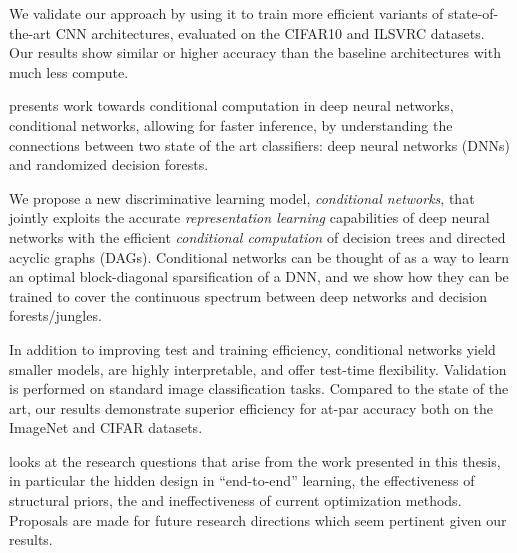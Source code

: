 \documentclass[thesis]{subfiles}
\begin{document}
\begin{description}
	We validate our approach by using it to train more efficient variants of state-of-the-art CNN architectures, evaluated on the CIFAR10 and ILSVRC datasets. Our results show similar or higher accuracy than the baseline architectures with much less compute. %
	
	\item[\Cref{conditionalnetworks}] presents work towards conditional computation in deep neural networks, conditional networks, allowing for faster inference, by understanding the connections between two state of the art classifiers: deep neural networks (DNNs) and randomized decision forests.
	
	We propose a new discriminative learning model, \emph{conditional networks}, 
	that jointly exploits the accurate \emph{representation learning} capabilities of deep neural networks with the efficient \emph{conditional computation} of decision trees and directed acyclic graphs (DAGs).
	Conditional networks can be thought of as a way to learn an optimal block-diagonal sparsification of a DNN, and we show how they can be trained to cover the continuous spectrum between deep networks and decision forests/jungles. 
	
	In addition to improving test and training efficiency, conditional networks yield smaller models, are highly interpretable, and offer test-time flexibility. Validation is performed on standard image classification tasks. Compared to the state of the art, our results demonstrate superior efficiency for at-par accuracy both on the ImageNet and CIFAR datasets.
	
	\item[\Cref{futurework}] looks at the research questions that arise from the work presented in this thesis, in particular the hidden design in ``end-to-end'' learning, the effectiveness of structural priors, the and ineffectiveness of current optimization methods. Proposals are made for future research directions which seem pertinent given our results.
	
\end{description}
\end{document}
